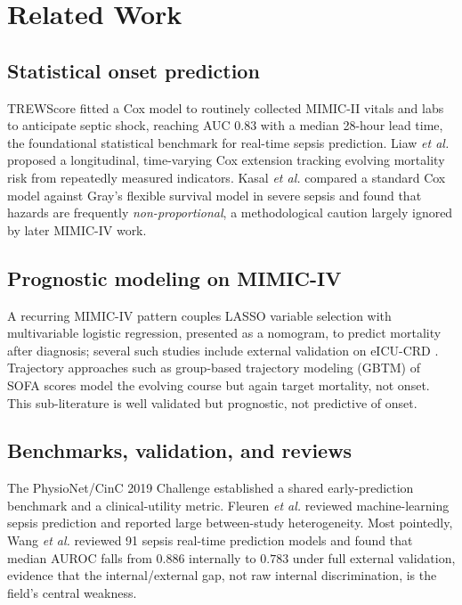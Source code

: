 \documentclass[conference]{IEEEtran}
\begin{document}
\section{Related Work}
\label{sec:related}

\subsection{Statistical onset prediction}
TREWScore \cite{henry2015trewscore} fitted a Cox model to routinely collected
MIMIC-II vitals and labs to anticipate septic shock, reaching AUC $0.83$ with a
median 28-hour lead time, the foundational statistical benchmark for real-time
sepsis prediction. Liaw \emph{et al.} \cite{liaw2019mortality} proposed a
longitudinal, time-varying Cox extension tracking evolving mortality risk from
repeatedly measured indicators. Kasal \emph{et al.} \cite{kasal2004cox}
compared a standard Cox model against Gray's flexible survival model in severe
sepsis and found that hazards are frequently \emph{non-proportional}, a
methodological caution largely ignored by later MIMIC-IV work.

\subsection{Prognostic modeling on MIMIC-IV}
A recurring MIMIC-IV pattern couples LASSO variable selection with
multivariable logistic regression, presented as a nomogram, to predict
mortality after diagnosis; several such studies include external validation on
eICU-CRD \cite{yuan2023nomogram}. Trajectory approaches such as group-based
trajectory modeling (GBTM) of SOFA scores \cite{yang2022gbtm} model the
evolving course but again target mortality, not onset. This sub-literature is
well validated but prognostic, not predictive of onset.

\subsection{Benchmarks, validation, and reviews}
The PhysioNet/CinC 2019 Challenge \cite{reyna2020physionet} established a shared
early-prediction benchmark and a clinical-utility metric. Fleuren \emph{et al.}
\cite{fleuren2020ml} reviewed machine-learning sepsis prediction and reported
large between-study heterogeneity. Most pointedly, Wang \emph{et al.}
\cite{wang2025srpm} reviewed 91 sepsis real-time prediction models and found
that median AUROC falls from $0.886$ internally to $0.783$ under full external
validation, evidence that the internal/external gap, not raw internal
discrimination, is the field's central weakness.
\end{document}

